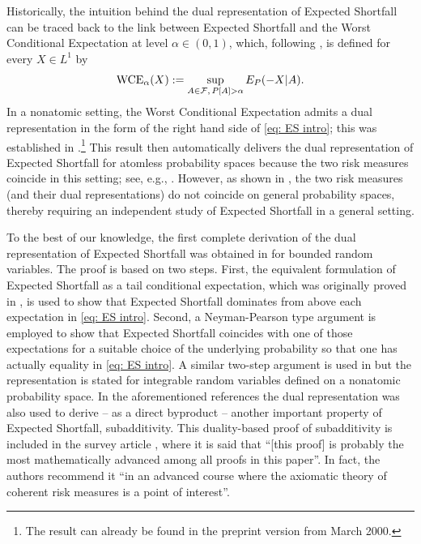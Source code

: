 \documentclass[12pt]{article}
\theoremstyle{plain}
\theoremstyle{definition}
\theoremstyle{remark}
\numberwithin{equation}{section}
\newcommand{\E}{E}
\newcommand{\probp}{P}
\newcommand{\cF}{{\mathcal{F}}}
\newcommand{\WCE}{\mathop {\rm WCE}\nolimits}
\begin{document}
\smallskip

Historically, the intuition behind the dual representation of Expected Shortfall can be traced back to the link between Expected Shortfall and the Worst Conditional Expectation at level $\alpha\in(0,1)$, which, following \cite{ArtznerDelbaenEberHeath1999}, is defined for every $X\in L^1$ by
\[
\WCE_\alpha(X) := \sup_{A\in\cF,\,\probp[A]>\alpha}\E_\probp(-X\vert A).
\]
In a nonatomic setting, the Worst Conditional Expectation admits a dual representation in the form of the right hand side of \eqref{eq: ES intro}; this was established in  \cite[Example 4.2]{Delbaen2002}.\footnote{The result can already be found in the preprint version from March 2000.} This result then automatically delivers the dual representation of Expected Shortfall for atomless probability spaces because the two risk measures coincide in this setting; see, e.g., \cite[Theorem 6.10]{Delbaen2002}. However, as shown in \cite{AcerbiTasche2002}, the two risk measures (and their dual representations) do not coincide on general probability spaces, thereby requiring an independent study of Expected Shortfall in a general setting.

\smallskip

To the best of our knowledge, the first complete derivation of the dual representation of Expected Shortfall was obtained in \cite[Theorem 4.39]{FoellmerSchied2002} for bounded random variables. The proof is based on two steps. First, the equivalent formulation of Expected Shortfall as a tail conditional expectation, which was originally proved in \cite{AcerbiTasche2002,Pflug2000}, is used to show that Expected Shortfall dominates from above each expectation in \eqref{eq: ES intro}. Second, a Neyman-Pearson type argument is employed to show that Expected Shortfall coincides with one of those expectations for a suitable choice of the underlying probability so that one has actually equality in \eqref{eq: ES intro}. %
A similar two-step argument is used in \cite{PflugRoemisch2007} but the representation is stated for integrable random variables defined on a nonatomic probability space. In the aforementioned references the dual representation was also used to derive -- as a direct byproduct -- another important property of Expected Shortfall, subadditivity. This duality-based proof of subadditivity is included in the survey article \cite{EmbrechtsWang2015}, where it is said that ``[this proof] is probably the most mathematically advanced among all proofs in this paper''. In fact, the authors recommend it ``in an advanced course where the axiomatic theory of coherent risk measures is a point of interest''.
\end{document}
